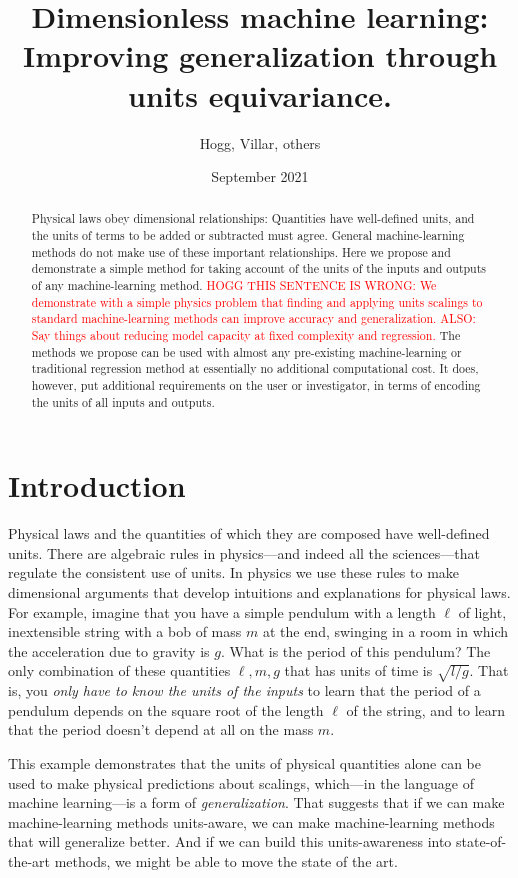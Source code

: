 \documentclass[12pt, letterpaper]{article}
\title{\bfseries
Dimensionless machine learning:\\
Improving generalization through units equivariance.}
\author{Hogg, Villar, others}
\date{September 2021}
\begin{document}
\maketitle\thispagestyle{empty}

\begin{abstract}\noindent
    Physical laws obey dimensional relationships:
    Quantities have well-defined units, and the units of terms to be added or subtracted must agree.
    General machine-learning methods do not make use of these important relationships.
    Here we propose and demonstrate a simple method for taking account of the units of the inputs and outputs of any machine-learning method.
    \textcolor{red}{HOGG THIS SENTENCE IS WRONG: We demonstrate with a simple physics problem that finding and applying units scalings to standard machine-learning methods can improve accuracy and generalization. ALSO: Say things about reducing model capacity at fixed complexity and regression.}
    The methods we propose can be used with almost any pre-existing machine-learning or traditional regression method at essentially no additional computational cost.
    It does, however, put additional requirements on the user or investigator, in terms of encoding the units of all inputs and outputs.
\end{abstract}

\section{Introduction}

Physical laws and the quantities of which they are composed have well-defined units.
There are algebraic rules in physics---and indeed all the sciences---that regulate the consistent use of units.
In physics we use these rules to make dimensional arguments that develop intuitions and explanations for physical laws.
For example, imagine that you have a simple pendulum with a length $\ell$ of light, inextensible string with a bob of mass $m$ at the end, swinging in a room in which the acceleration due to gravity is $g$. What is the period of this pendulum? The only combination of these quantities $\ell, m, g$ that has units of time is $\sqrt{l/g}$. That is, you \emph{only have to know the units of the inputs} to learn that the period of a pendulum depends on the square root of the length $\ell$ of the string, and to learn that the period doesn't depend at all on the mass $m$.

This example demonstrates that the units of physical quantities alone can be used to make physical predictions about scalings, which---in the language of machine learning---is a form of \emph{generalization}.
That suggests that if we can make machine-learning methods units-aware, we can make machine-learning methods that will generalize better.
And if we can build this units-awareness into state-of-the-art methods, we might be able to move the state of the art.
\end{document}
